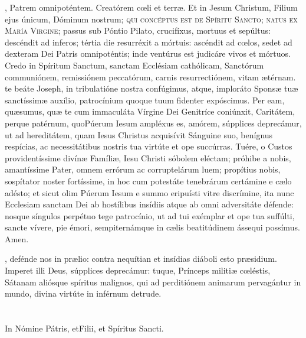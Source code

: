 \documentclass[./L00_main.tex]{subfiles}
\begin{document}
\begin{minipage}[t]{0.475\textwidth}
    , Patrem omnipoténtem. Creatórem c{\oe}li et terr{\ae}. Et in Jesum Christum, Filium ejus únicum, Dóminum nostrum;
    \textsc{qui concéptus est de Spíritu Sancto; natus ex María Virgine}; passus sub Póntio Pilato, crucifíxus, mortuus et sepúltus:
    descéndit ad inferos; tértia die resurréxit a mórtuis: ascéndit ad c{\oe}los, sedet ad dexteram Dei Patris omnipoténtis;
    inde ventúrus est judicáre vivos et mórtuos. Credo in Spíritum Sanctum, sanctam Ecclésiam cathólicam, Sanctórum communiónem,
    remissiónem peccatórum, carnis resurrectiónem, vitam {\ae}térnam. \\

     te beáte Joseph, in tribulatióne nostra confúgimus, atque, imploráto Spons{\ae} tu{\ae} sanctíssim{\ae} auxílio, patrocínium 
    quoque tuum fidenter expóscimus. Per eam, qu{\ae}sumus, qu{\ae} te cum immaculáta Vírgine Dei Genitríce coniúnxit, Caritátem, perque patérnum, 
    quoPúerum Iesum ampléxus es, amórem, súpplices deprecámur, ut ad hereditátem, quam Iesus Christus acquisívit Sánguine suo, benígnus respícias, 
    ac necessitátibus nostris tua virtúte et ope succúrras. Tuére, o Custos providentíssime divín{\ae} Famíli{\ae}, Iesu Christi sóbolem eléctam; próhibe a nobis, 
    amantíssime Pater, omnem errórum ac corruptelárum luem; propítius nobis, sospítator noster fortíssime, in hoc cum potestáte tenebrárum certámine e 
    c{\ae}lo adésto; et sicut olim Púerum Iesum e summo eripuísti vitre discrímine, ita nunc Ecclesiam sanctam Dei ab hostílibus insídiis atque ab omni 
    adversitáte défende: nosque síngulos perpétuo tege patrocínio, ut ad tui exémplar et ope tua suffúlti, sancte vívere, pie émori, sempiternámque in 
    c{\ae}lis beatitúdinem ássequi possímus. Amen.\\

    \hspace{4.5mm}

    , defénde nos in pr{\ae}lio: contra nequítian et insídias diáboli esto pr{\ae}sidium. Imperet illi Deus, 
    súpplices deprecámur: tuque, Prínceps militi{\ae} c{\oe}léstis, Sátanam aliósque spíritus malignos, qui ad perditiónem animarum pervagántur in mundo,
    divina virtúte in inférnum detrude. \\

    \\

    \\

    In Nómine Pátris, et{\redcross}Filii, et Spíritus Sancti.
\end{minipage}
\end{document}
